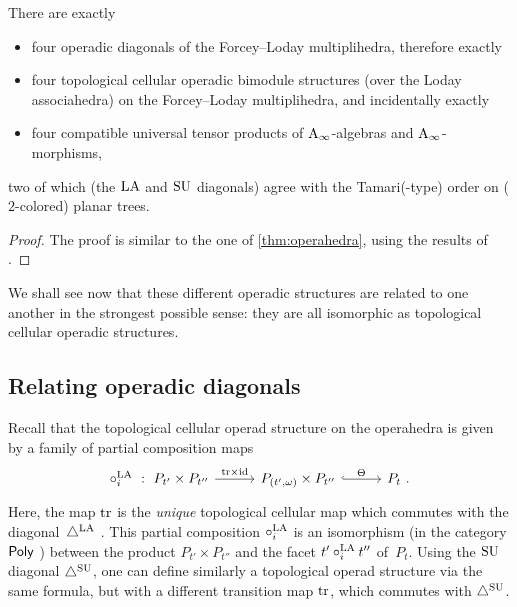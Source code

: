 \begin{samepage}
\begin{theorem}
There are exactly 
\begin{itemize}
    \item four operadic diagonals of the Forcey--Loday multiplihedra, therefore exactly
    \item four topological cellular operadic bimodule structures (over the Loday associahedra) on the Forcey--Loday multiplihedra, and incidentally exactly
    \item four compatible universal tensor products of $\mathrm{A}_\infty$-algebras and $\mathrm{A}_\infty$-morphisms,
\end{itemize}
two of which (the $\mathrm{LA}$ and $\mathrm{SU}$ diagonals) agree with the Tamari(-type) order on ($2$-colored) planar trees. 
\end{theorem}
\end{samepage}

\begin{proof}
    The proof is similar to the one of \cref{thm:operahedra}, using the results of \cite{MazuirLA22}.
\end{proof}

We shall see now that these different operadic structures are related to one another in the strongest possible sense: they are all isomorphic as topological cellular operadic structures.



\subsection{Relating operadic diagonals} 



Recall that the topological cellular operad structure on the operahedra \cite[Def. 4.17]{LA21} is given by a family of partial composition maps 
\[
\vcenter{\hbox{
\begin{tikzcd}[column sep=1cm]
\circ_i^{\LA}\ : \ P_{t'}\times P_{t''}
\arrow[r,  "\tr\times \id"]
& P_{(t',\omega)}\times P_{t''}
 \arrow[r,hookrightarrow, "\Theta"]
&
P_t \ .
\end{tikzcd}
}}  \]
Here, the map $\mathrm{tr}$ is the \emph{unique} topological cellular map which commutes with the diagonal~$\triangle^{\mathrm{LA}}$ \cite[Prop. 7]{masudaDiagonalAssociahedra2021}. 
This partial composition $\circ_i^{\mathrm{LA}}$ is an isomorphism (in the category $\mathsf{Poly}$ \cite[Def. 4.13]{LA21}) between the product $P_{t'}\times P_{t''}$ and the facet $t' \circ_i^{\mathrm{LA}} t''$ of~$P_t$.
Using the $\mathrm{SU}$ diagonal $\triangle^{\mathrm{SU}}$, one can define similarly a topological operad structure via the same formula, but with a different transition map $\mathrm{tr}$, which commutes with $\triangle^{\mathrm{SU}}$.


